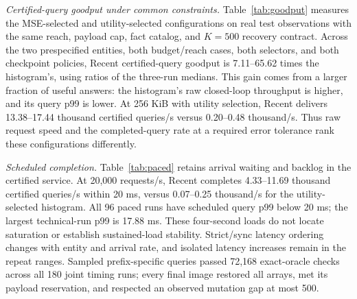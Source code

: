 \emph{Certified-query goodput under common constraints.} Table~\ref{tab:goodput} measures the MSE-selected and utility-selected configurations on real test observations with the same reach, payload cap, fact catalog, and $K=500$ recovery contract. Across the two prespecified entities, both budget/reach cases, both selectors, and both checkpoint policies, Recent certified-query goodput is 7.11--65.62 times the histogram's, using ratios of the three-run medians. This gain comes from a larger fraction of useful answers: the histogram's raw closed-loop throughput is higher, and its query p99 is lower. At 256 KiB with utility selection, Recent delivers 13.38--17.44 thousand certified queries/s versus 0.20--0.48 thousand/s. Thus raw request speed and the completed-query rate at a required error tolerance rank these configurations differently.



\emph{Scheduled completion.} Table~\ref{tab:paced} retains arrival waiting and backlog in the certified service. At 20,000 requests/s, Recent completes 4.33--11.69 thousand certified queries/s within 20 ms, versus 0.07--0.25 thousand/s for the utility-selected histogram. All 96 paced runs have scheduled query p99 below 20 ms; the largest technical-run p99 is 17.88 ms. These four-second loads do not locate saturation or establish sustained-load stability. Strict/sync latency ordering changes with entity and arrival rate, and isolated latency increases remain in the repeat ranges. Sampled prefix-specific queries passed 72,168 exact-oracle checks across all 180 joint timing runs; every final image restored all arrays, met its payload reservation, and respected an observed mutation gap at most 500.


